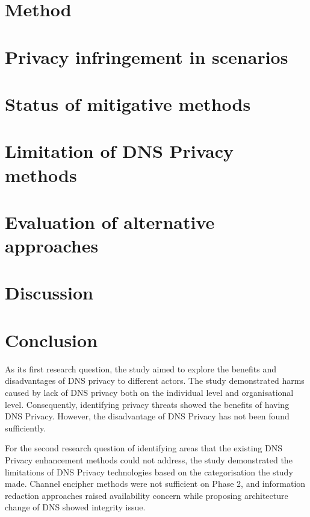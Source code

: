 \documentclass[a4paper,12pt]{article}
\begin{document}
\newpage
\section{Method}\label{Method}


\newpage
\section{Privacy infringement in scenarios}\label{scenariosresult}


\newpage
\section{Status of mitigative methods}\label{surveyresults}


\newpage
\section{Limitation of DNS Privacy methods}\label{limitationsresult}


\newpage
\section{Evaluation of alternative approaches}\label{alternativeresult}

\newpage

\section{Discussion}

\newpage

\section{Conclusion}
As its first research question, the study aimed to explore the benefits and disadvantages of DNS privacy to different actors. The study demonstrated harms caused by lack of DNS privacy both on the individual level and organisational level. Consequently, identifying privacy threats showed the benefits of having DNS Privacy. However, the disadvantage of DNS Privacy has not been found sufficiently.

For the second research question of identifying areas that the existing DNS Privacy enhancement methods could not address, the study demonstrated the limitations of DNS Privacy technologies based on the categorisation the study made. Channel encipher methods were not sufficient on Phase 2, and information redaction approaches raised availability concern while proposing architecture change of DNS showed integrity issue. 
\end{document}
